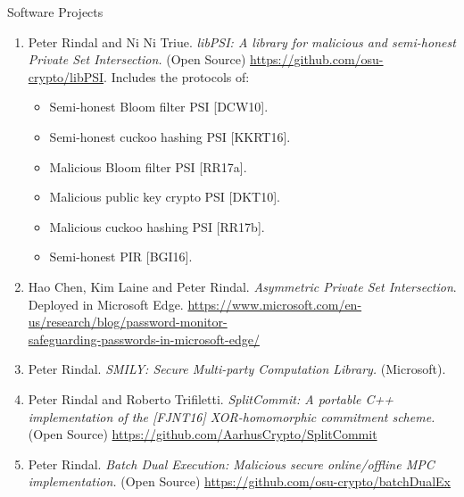 \documentclass{resume} %
\begin{document}
\begin{rSection}{Software Projects}
\begin{enumerate}[label=S\arabic* --]
		\item Peter Rindal and Ni Ni Triue. \emph{libPSI: A library for malicious and semi-honest Private Set Intersection.} (Open Source) \url{https://github.com/osu-crypto/libPSI}. Includes the protocols of:
		\begin{itemize}		
		\item Semi-honest Bloom filter PSI [DCW10]. 
		\item Semi-honest cuckoo hashing PSI [KKRT16]. 
		\item Malicious Bloom filter PSI [RR17a]. 
		\item Malicious public key crypto PSI [DKT10]. 
		\item Malicious cuckoo hashing PSI [RR17b]. 
		\item Semi-honest PIR [BGI16].		
	\end{itemize}

	\item Hao Chen, Kim Laine and Peter Rindal. \emph{Asymmetric Private Set Intersection}. Deployed in Microsoft Edge. \url{https://www.microsoft.com/en-us/research/blog/password-monitor-}\\ \url{safeguarding-passwords-in-microsoft-edge/}
	
	\item Peter Rindal. \emph{SMILY: Secure Multi-party Computation Library.} (Microsoft).

	\item Peter Rindal and Roberto Trifiletti. \emph{SplitCommit: A portable C++ implementation of the [FJNT16] XOR-homomorphic commitment scheme.} (Open Source) \url{https://github.com/AarhusCrypto/SplitCommit}
	
	\item Peter Rindal. \emph{Batch Dual Execution: Malicious secure online/offline MPC implementation.}  (Open Source) \url{https://github.com/osu-crypto/batchDualEx}
	\end{enumerate}
	
\end{rSection}



\end{document}
